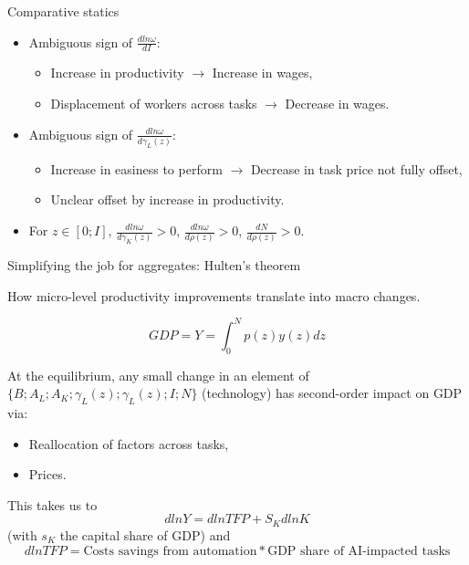 \documentclass{beamer}
\begin{document}
\begin{frame}{Comparative statics}

\begin{itemize}
    \item Ambiguous sign of \(\frac{dln\omega}{dI}\):
    \begin{itemize}
        \item Increase in productivity \(\rightarrow\) Increase in wages,
        \item Displacement of workers across tasks \(\rightarrow\) Decrease in wages.
    \end{itemize}
    \item Ambiguous sign of \(\frac{dln\omega}{d\gamma_L(z)}\):
    \begin{itemize}
        \item Increase in easiness to perform \(\rightarrow\) Decrease in task price not fully offset,
        \item Unclear offset by increase in productivity.
    \end{itemize}
    \item For \(z\in[0;I]\), \(\frac{dln\omega}{d\gamma_K(z)}>0\), \(\frac{dln\omega}{d\rho(z)}>0\), \(\frac{dN}{d\rho(z)}>0\).
\end{itemize}
\end{frame}

\begin{frame}{Simplifying the job for aggregates: Hulten's theorem}

How micro-level productivity improvements translate into macro changes.

\[GDP=Y=\int_{0}^{N}p(z)y(z)dz\]

At the equilibrium, any small change in an element of \(\{B;A_L;A_K;\gamma_L(z);\gamma_L(z);I;N\}\) (technology) has second-order impact on GDP via:
\begin{itemize}
    \item Reallocation of factors across tasks,
    \item Prices.
\end{itemize} 

This takes us to
\[dlnY=dlnTFP+S_KdlnK\]
(with \(s_K\) the capital share of GDP) and
\[dlnTFP=\text{Costs savings from automation}*\text{GDP share of AI-impacted tasks}\]

\end{frame}
\end{document}
